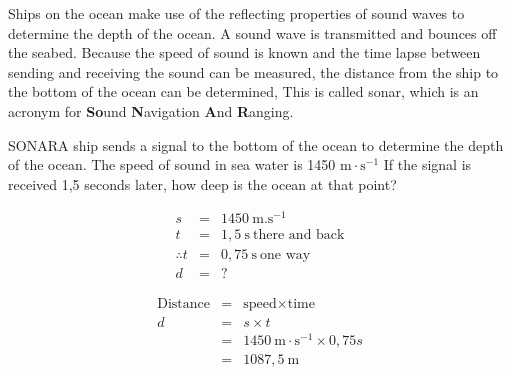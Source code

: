 \begin{minipage}{.5\textwidth}
\begin{figure}[H]
\begin{center}
\end{center}

 \end{figure}       
\end{minipage}
\begin{minipage}{.5\textwidth}
      \label{m38800*id185212}Ships on the ocean make use of the reflecting properties of sound waves to determine the depth of the ocean. A sound wave is transmitted and bounces off the seabed. Because the speed of sound is known and the time lapse between sending and receiving the sound can be measured, the distance from the ship to the bottom of the ocean can be determined, This is called sonar, which is an acronym for \textbf{So}und \textbf{N}avigation \textbf{A}nd \textbf{R}anging.\par 
      \label{m38800*uid13}
     \end{minipage}
            

\begin{wex}{SONAR}{A ship sends a signal to the bottom of the ocean to determine the depth of the ocean. The speed of sound in sea water is 1450 $\text{m}\cdot\text{s}^{-1}$ If the signal is received 1,5 seconds later, how deep is the ocean at that point?}{
\begin{eqnarray*}
s &=& 1450 \ \text{m}.\text{s}^{-1}\\
t &=& 1,5 \ \text{s} \ \text{there \ and \ back}\\
\therefore t &= & 0,75 \ \text{s} \ \text{one \ way}\\
d &=& ?
\end{eqnarray*}

\begin{eqnarray*}
\text{Distance} &=& \text{speed} \times \text{time} \\
d &=& s \times t \\
&=& 1450~\text{m}\cdot\text{s}^{-1} \times 0,75 s \\
&=& 1087,5 \ \text{m}
\end{eqnarray*}
}\end{wex}
 
